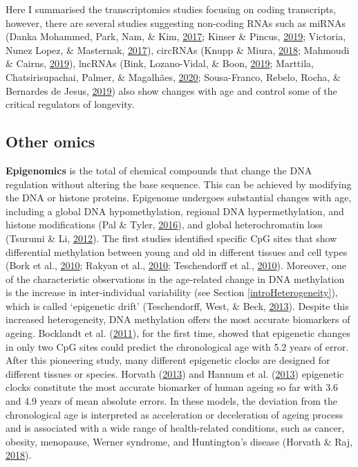 \documentclass[12pt,twoside]{unicam}
\begin{document}
Here I summarised the transcriptomics studies focusing on coding transcripts, however, there are several studies suggesting non-coding RNAs such as miRNAs (Danka Mohammed, Park, Nam, \& Kim, \protect\hyperlink{ref-DankaMohammed2017}{2017}; Kinser \& Pincus, \protect\hyperlink{ref-Kinser2019}{2019}; Victoria, Nunez Lopez, \& Masternak, \protect\hyperlink{ref-Victoria2017}{2017}), circRNAs (Knupp \& Miura, \protect\hyperlink{ref-Knupp2018}{2018}; Mahmoudi \& Cairns, \protect\hyperlink{ref-Mahmoudi2019}{2019}), lncRNAs (Bink, Lozano-Vidal, \& Boon, \protect\hyperlink{ref-Bink2019}{2019}; Marttila, Chatsirisupachai, Palmer, \& Magalhães, \protect\hyperlink{ref-Marttila2020}{2020}; Sousa-Franco, Rebelo, Rocha, \& Bernardes de Jesus, \protect\hyperlink{ref-Sousa-Franco2019}{2019}) also show changes with age and control some of the critical regulators of longevity.

\hypertarget{introOtherOmics}{%
\subsection{Other omics}\label{introOtherOmics}}

\textbf{Epigenomics} is the total of chemical compounds that change the DNA regulation without altering the base sequence. This can be achieved by modifying the DNA or histone proteins. Epigenome undergoes substantial changes with age, including a global DNA hypomethylation, regional DNA hypermethylation, and histone modifications (Pal \& Tyler, \protect\hyperlink{ref-Pal2016}{2016}), and global heterochromatin loss (Tsurumi \& Li, \protect\hyperlink{ref-Tsurumi2012}{2012}). The first studies identified specific CpG sites that show differential methylation between young and old in different tissues and cell types (Bork et al., \protect\hyperlink{ref-Bork2010}{2010}; Rakyan et al., \protect\hyperlink{ref-Rakyan2010}{2010}; Teschendorff et al., \protect\hyperlink{ref-Teschendorff2010}{2010}). Moreover, one of the characteristic observations in the age-related change in DNA methylation is the increase in inter-individual variability (see Section \ref{introHeterogeneity}), which is called `epigenetic drift' (Teschendorff, West, \& Beck, \protect\hyperlink{ref-Teschendorff2013}{2013}). Despite this increased heterogeneity, DNA methylation offers the most accurate biomarkers of ageing. Bocklandt et al. (\protect\hyperlink{ref-Bocklandt2011}{2011}), for the first time, showed that epigenetic changes in only two CpG sites could predict the chronological age with 5.2 years of error. After this pioneering study, many different epigenetic clocks are designed for different tissues or species. Horvath (\protect\hyperlink{ref-Horvath2013}{2013}) and Hannum et al. (\protect\hyperlink{ref-Hannum2013}{2013}) epigenetic clocks constitute the most accurate biomarker of human ageing so far with 3.6 and 4.9 years of mean absolute errors. In these models, the deviation from the chronological age is interpreted as acceleration or deceleration of ageing process and is associated with a wide range of health-related conditions, such as cancer, obesity, menopause, Werner syndrome, and Huntington's disease (Horvath \& Raj, \protect\hyperlink{ref-Horvath2018}{2018}).
\end{document}
